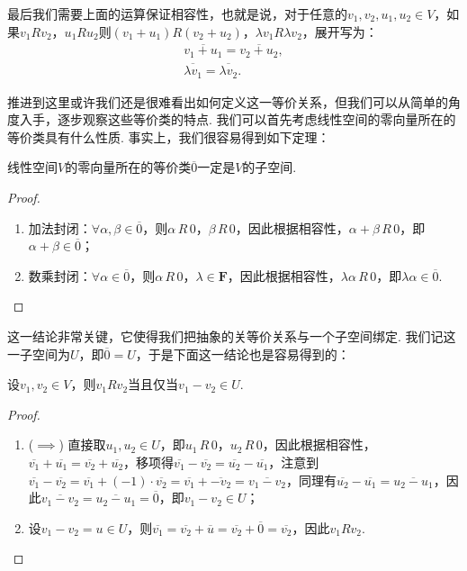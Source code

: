 最后我们需要上面的运算保证相容性，也就是说，对于任意的$v_1,v_2,u_1,u_2\in V$，如果$v_1Rv_2$，$u_1Ru_2$则$(v_1+u_1)R(v_2+u_2)$，$\lambda v_1R\lambda v_2$，展开写为：
\begin{gather*}
    \overline{v_1+u_1}=\overline{v_2+u_2},\\
    \overline{\lambda v_1}=\overline{\lambda v_2}.
\end{gather*}

推进到这里或许我们还是很难看出如何定义这一等价关系，但我们可以从简单的角度入手，逐步观察这些等价类的特点. 我们可以首先考虑线性空间的零向量所在的等价类具有什么性质. 事实上，我们很容易得到如下定理：
\begin{theorem}{}{}
    线性空间$V$的零向量所在的等价类$\overline{0}$一定是$V$的子空间.
\end{theorem}
\begin{proof}
    \begin{enumerate}
        \item 加法封闭：$\forall \alpha,\beta\in\overline{0}$，则$\alpha\,R\,0$，$\beta\,R\,0$，因此根据相容性，$\alpha+\beta\,R\,0$，即$\alpha+\beta\in\overline{0}$；
        \item 数乘封闭：$\forall \alpha\in\overline{0}$，则$\alpha\,R\,0$，$\lambda\in\mathbf{F}$，因此根据相容性，$\lambda\alpha\,R\,0$，即$\lambda\alpha\in\overline{0}$.
    \end{enumerate}
\end{proof}

这一结论非常关键，它使得我们把抽象的关等价关系与一个子空间绑定. 我们记这一子空间为$U$，即$\overline{0}=U$，于是下面这一结论也是容易得到的：
\begin{theorem}{}{}
    设$v_1,v_2\in V$，则$v_1Rv_2$当且仅当$v_1-v_2\in U$.
\end{theorem}
\begin{proof}
    \begin{enumerate}
        \item ($\implies$) 直接取$u_1,u_2\in U$，即$u_1\,R\,0$，$u_2\,R\,0$，因此根据相容性，$\overline{v_1}+\overline{u_1}=\overline{v_2}+\overline{u_2}$，移项得$\overline{v_1}-\overline{v_2}=\overline{u_2}-\overline{u_1}$，注意到$\overline{v_1}-\overline{v_2}=\overline{v_1}+(-1)\cdot\overline{v_2}=\overline{v_1}+\overline{-v_2}=\overline{v_1-v_2}$，同理有$\overline{u_2}-\overline{u_1}=\overline{u_2-u_1}$，因此$\overline{v_1-v_2}=\overline{u_2-u_1}=\overline{0}$，即$v_1-v_2\in U$；
        \item 设$v_1-v_2=u\in U$，则$\overline{v_1}=\overline{v_2}+\overline{u}=\overline{v_2}+\overline{0}=\overline{v_2}$，因此$v_1Rv_2$.
    \end{enumerate}
\end{proof}

